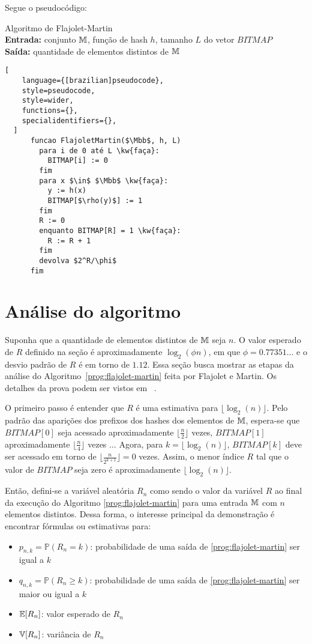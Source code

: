 Segue o pseudocódigo:
\begin{programruledcaption}{
Algoritmo de Flajolet-Martin 
\\ \textbf{Entrada:} conjunto $\mathbb{M}$, função de hash $h$, tamanho $L$ do vetor $BITMAP$ 
\\ \textbf{Saída:} quantidade de elementos distintos de $\mathbb{M}$
\label{prog:flajolet-martin}
}
  \begin{lstlisting}[
    language={[brazilian]pseudocode},
    style=pseudocode,
    style=wider,
    functions={},
    specialidentifiers={},
  ]
      funcao FlajoletMartin($\Mbb$, h, L)
        para i de 0 até L \kw{faça}:
          BITMAP[i] := 0
        fim
        para x $\in$ $\Mbb$ \kw{faça}:
          y := h(x)
          BITMAP[$\rho(y)$] := 1
        fim
        R := 0
        enquanto BITMAP[R] = 1 \kw{faça}:
          R := R + 1
        fim
        devolva $2^R/\phi$
      fim
  \end{lstlisting}
\end{programruledcaption}

\section{Análise do algoritmo}
\label{sec:flajolet-martin:analysis}

Suponha que a quantidade de elementos distintos de $\mathbb{M}$ seja $n$. O valor esperado de $R$ definido na seção 
 é aproximadamente $\log_2(\phi n)$, em que $\phi = 0.77351\dots$ e o desvio padrão 
de $R$ é em torno de $1.12$. Essa seção busca mostrar as etapas da análise do Algoritmo~\ref{prog:flajolet-martin} feita 
por Flajolet e Martin. Os detalhes da prova podem ser vistos em ~\citep{flajolet:martin:85}.

O primeiro passo é entender que $R$ é uma estimativa para $\lfloor \log_2(n) \rfloor$. Pelo padrão das aparições dos 
prefixos dos hashes dos elementos de $\mathbb{M}$, espera-se que $BITMAP[0]$ seja acessado aproximadamente $\lfloor 
\frac{n}{2} \rfloor$ vezes, $BITMAP[1]$ aproximadamente $\lfloor \frac{n}{4} \rfloor$ vezes $\dots$ Agora, para 
$k = \lfloor \log_2(n) \rfloor$, $BITMAP[k]$ deve ser acessado em torno de $\lfloor \frac{n}{2^{k+1}} \rfloor = 0$ 
vezes. Assim, o menor índice $R$ tal que o valor de $BITMAP$ seja zero é aproximadamente $\lfloor \log_2(n) \rfloor$.

Então, defini-se a variável aleatória $R_n$ como sendo o valor da variável $R$ ao final da execução do Algoritmo 
\ref{prog:flajolet-martin} para uma entrada $\mathbb{M}$ com $n$ elementos distintos. Dessa forma, o interesse principal 
da demonstração é encontrar fórmulas ou estimativas para:
\begin{itemize}
  \item $p_{n,k} = \mathbb{P}(R_n = k)$: probabilidade de uma saída de \ref{prog:flajolet-martin} ser igual a $k$
  \item $q_{n,k} = \mathbb{P}(R_n \geq k)$: probabilidade de uma saída de \ref{prog:flajolet-martin} 
  ser maior ou igual a $k$
  \item $\mathbb{E}[R_n]$: valor esperado de $R_n$
  \item $\mathbb{V}[R_n]$: variância de $R_n$
\end{itemize}

